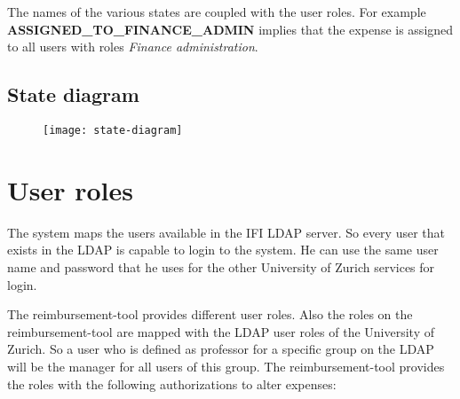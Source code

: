 The names of the various states are coupled with the user roles. For example \textbf{ASSIGNED\_TO\_FINANCE\_ADMIN} implies that the expense is assigned to all users with roles \textit{Finance administration}.
\newpage

\subsection{State diagram}
\label{sec:state-diagram}

\begin{figure}[H]
	{\texttt{[image: state-diagram]}}
\end{figure}
\newpage

\section{User roles}
\label{sec:user-roles}

The system maps the users available in the IFI LDAP server. So every user that exists in the LDAP is capable to login to the system. He can use the same user name and password that he uses for the other University of Zurich services for login. \par

The reimbursement-tool provides different user roles. Also the roles on the reimbursement-tool are mapped with the LDAP user roles of the University of Zurich. So a user who is defined as professor for a specific group on the LDAP will be the manager for all users of this group. The reimbursement-tool provides the roles with the following authorizations to alter expenses:

